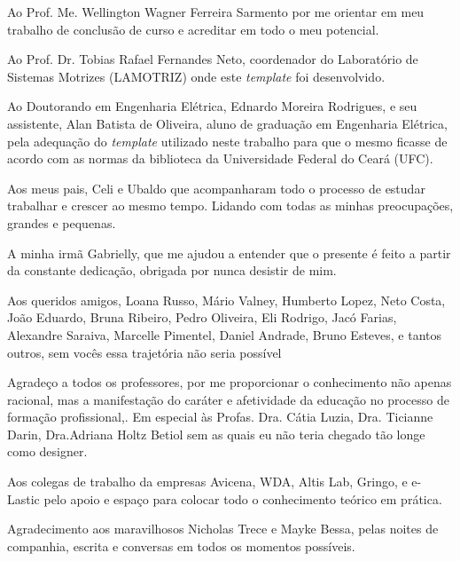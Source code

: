 
Ao Prof. Me. Wellington Wagner Ferreira Sarmento por me orientar em meu trabalho de conclusão de curso e acreditar em todo o meu potencial.

Ao Prof. Dr. Tobias Rafael Fernandes Neto, coordenador do Laboratório de Sistemas Motrizes (LAMOTRIZ) onde este \textit{template} foi desenvolvido. 

Ao Doutorando em Engenharia Elétrica, Ednardo Moreira Rodrigues, e seu assistente, Alan Batista de Oliveira, aluno de graduação em Engenharia Elétrica, pela adequação do \textit{template} utilizado neste trabalho para que o mesmo ficasse de acordo com as normas da biblioteca da Universidade Federal do Ceará (UFC). %

Aos meus pais, Celi e Ubaldo que acompanharam todo o processo de estudar trabalhar e crescer ao mesmo tempo. Lidando com todas as minhas preocupações, grandes e pequenas.

A minha irmã Gabrielly, que me ajudou a entender que o presente é feito a partir da constante dedicação, obrigada por nunca desistir de mim.

Aos queridos amigos, Loana Russo, Mário Valney, Humberto Lopez, Neto Costa, João Eduardo, Bruna Ribeiro, Pedro Oliveira, Eli Rodrigo, Jacó Farias, Alexandre Saraiva, Marcelle Pimentel, Daniel Andrade,  Bruno Esteves, e tantos outros, sem vocês essa trajetória não seria possível

Agradeço a todos os professores, por me proporcionar o conhecimento não apenas racional, mas a manifestação do caráter e afetividade da educação no processo de formação profissional,. Em especial às Profas. Dra. Cátia Luzia, Dra. Ticianne Darin, Dra.Adriana Holtz Betiol sem as quais eu não teria chegado tão longe como designer.

Aos colegas de trabalho da empresas Avicena, WDA, Altis Lab, Gringo, e e-Lastic pelo apoio e espaço para colocar todo o conhecimento teórico em prática.

Agradecimento aos maravilhosos Nicholas Trece  e Mayke Bessa, pelas noites de companhia, escrita e conversas em todos os momentos possíveis.